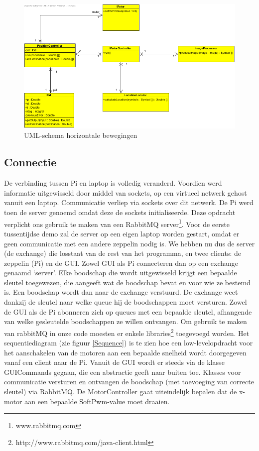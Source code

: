 \documentclass[eind]{penoverslag}
\begin{document}
\begin{figure}[H]
\begin{center}
\includegraphics[width=\textwidth]{XYNavigation.png}
\end{center}
\caption{UML-schema horizontale bewegingen}
\label{navigation}
\end{figure}

\subsection{Connectie}
De verbinding tussen Pi en laptop is volledig veranderd. Voordien werd informatie uitgewisseld door middel van sockets, op een virtueel netwerk gehost vanuit een laptop. Communicatie verliep via sockets over dit netwerk. De Pi werd toen de server genoemd omdat deze de sockets initialiseerde. Deze opdracht verplicht ons gebruik te maken van een RabbitMQ server\footnote{www.rabbitmq.com}. Voor de eerste tussentijdse demo zal de server op een eigen laptop worden gestart, omdat er geen communicatie met een andere zeppelin nodig is. We hebben nu dus de server (de exchange) die losstaat van de rest van het programma, en twee clients: de zeppelin (Pi) en de GUI. Zowel GUI als Pi connecteren dan op een exchange genaamd ‘server’. Elke boodschap die wordt uitgewisseld krijgt een bepaalde sleutel toegewezen, die aangeeft wat de boodschap bevat en voor wie ze bestemd is. Een boodschap wordt dan naar de exchange verstuurd. De exchange weet dankzij de sleutel naar welke queue hij de boodschappen moet versturen. Zowel de GUI als de Pi abonneren zich op queues met een bepaalde sleutel, afhangende van welke gesleutelde boodschappen ze willen ontvangen. Om gebruik te maken van rabbitMQ in onze code moesten er enkele libraries\footnote{http://www.rabbitmq.com/java-client.html} toegevoegd worden. Het sequentiediagram (zie figuur \ref{Sequence}) is te zien hoe een low-levelopdracht voor het aanschakelen van de motoren aan een bepaalde snelheid wordt doorgegeven vanaf een client naar de Pi. Vanuit de GUI wordt er steeds via de klasse GUICommands gegaan, die een abstractie geeft naar buiten toe. Klasses voor communicatie versturen en ontvangen de boodschap (met toevoeging van correcte sleutel) via RabbitMQ. De MotorController gaat uiteindelijk bepalen dat de x-motor aan een bepaalde SoftPwm-value moet draaien.
\\
\end{document}

